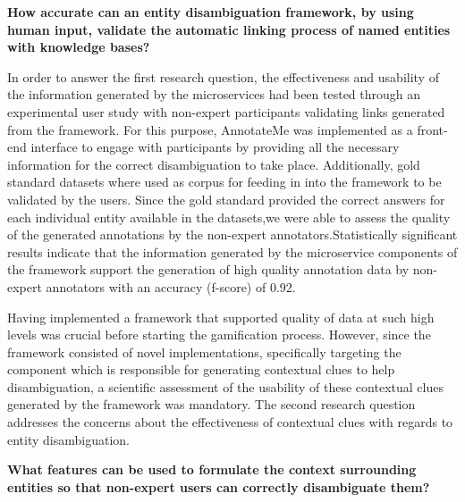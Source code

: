 





 \textbf{How accurate can an entity disambiguation framework, by using human input, validate the automatic linking process of named entities with knowledge bases?}\hfill \break

In order to answer the first research question, the effectiveness and usability of the information generated by the microservices had been tested through an experimental user study with non-expert participants validating links generated from the framework. For this purpose, AnnotateMe was implemented as a front-end interface to engage with participants by providing all the necessary information for the correct disambiguation to take place. \if Additionally, gold standard datasets where used as corpus for feeding in into the framework to be validated by the users. Since the gold standard provided the correct answers for each individual entity available in the datasets,we were able to assess the quality of the generated annotations by the non-expert annotators.\fi Statistically significant results indicate that the information generated by the microservice components of the framework support the generation of high quality annotation data by non-expert annotators with an accuracy (f-score) of 0.92. 

\if Having implemented a framework that supported quality of data at such high levels was crucial before starting the gamification process. However, since the framework consisted of novel implementations, specifically targeting the component which is responsible for generating contextual clues to help disambiguation, a scientific assessment of the usability of these contextual clues generated by the framework was mandatory. The second research question addresses the concerns about the effectiveness of contextual clues with regards to entity disambiguation.\fi \hfill \break
    
\textbf{What features can be used to formulate the context surrounding entities so that non-expert users can correctly disambiguate them?}  \hfill \break

